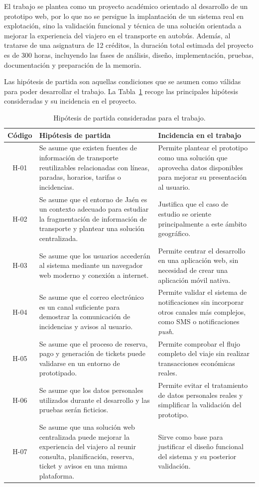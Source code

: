 El trabajo se plantea como un proyecto académico orientado al desarrollo de un prototipo web, por lo que no se persigue la implantación de un sistema real en explotación, sino la validación funcional y técnica de una solución orientada a mejorar la experiencia del viajero en el transporte en autobús. Además, al tratarse de una asignatura de 12 créditos, la duración total estimada del proyecto es de 300 horas, incluyendo las fases de análisis, diseño, implementación, pruebas, documentación y preparación de la memoria.

Las hipótesis de partida son aquellas condiciones que se asumen como válidas para poder desarrollar el trabajo. La Tabla~\ref{tab:hipotesis} recoge las principales hipótesis consideradas y su incidencia en el proyecto.

\begin{table}[h!]
\centering
\small
\begin{tabular}{|c|p{6cm}|p{6cm}|}
\hline
\textbf{Código} & \textbf{Hipótesis de partida} & \textbf{Incidencia en el trabajo} \\ \hline
H-01 & Se asume que existen fuentes de información de transporte reutilizables relacionadas con líneas, paradas, horarios, tarifas o incidencias. & Permite plantear el prototipo como una solución que aprovecha datos disponibles para mejorar su presentación al usuario. \\ \hline
H-02 & Se asume que el entorno de Jaén es un contexto adecuado para estudiar la fragmentación de información de transporte y plantear una solución centralizada. & Justifica que el caso de estudio se oriente principalmente a este ámbito geográfico. \\ \hline
H-03 & Se asume que los usuarios accederán al sistema mediante un navegador web moderno y conexión a internet. & Permite centrar el desarrollo en una aplicación web, sin necesidad de crear una aplicación móvil nativa. \\ \hline
H-04 & Se asume que el correo electrónico es un canal suficiente para demostrar la comunicación de incidencias y avisos al usuario. & Permite validar el sistema de notificaciones sin incorporar otros canales más complejos, como SMS o notificaciones \textit{push}. \\ \hline
H-05 & Se asume que el proceso de reserva, pago y generación de tickets puede validarse en un entorno de prototipado. & Permite comprobar el flujo completo del viaje sin realizar transacciones económicas reales. \\ \hline
H-06 & Se asume que los datos personales utilizados durante el desarrollo y las pruebas serán ficticios. & Permite evitar el tratamiento de datos personales reales y simplificar la validación del prototipo. \\ \hline
H-07 & Se asume que una solución web centralizada puede mejorar la experiencia del viajero al reunir consulta, planificación, reserva, ticket y avisos en una misma plataforma. & Sirve como base para justificar el diseño funcional del sistema y su posterior validación. \\ \hline
\end{tabular}
\caption{Hipótesis de partida consideradas para el trabajo.}
\label{tab:hipotesis}
\end{table}


